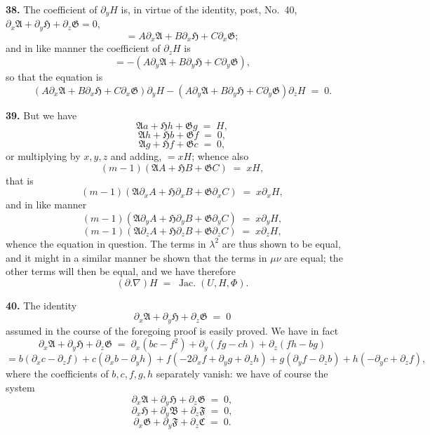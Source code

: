 \documentclass[11pt,a4paper]{article}
\providecommand{\Jac}{\operatorname{Jac.}}
\begin{document}
\medskip

\textbf{38.} The coefficient of $\partial_y H$ is, in virtue of the identity, post, No.~40, $\partial_x\mathfrak{A} + \partial_y\mathfrak{H} + \partial_z\mathfrak{G} = 0$,
\[
= A\partial_x\mathfrak{A} + B\partial_x\mathfrak{H} + C\partial_x\mathfrak{G};
\]
and in like manner the coefficient of $\partial_z H$ is
\[
= -(A\partial_y\mathfrak{A} + B\partial_y\mathfrak{H} + C\partial_y\mathfrak{G}),
\]
so that the equation is
\[
(A\partial_x\mathfrak{A} + B\partial_x\mathfrak{H} + C\partial_x\mathfrak{G})\partial_y H - (A\partial_y\mathfrak{A} + B\partial_y\mathfrak{H} + C\partial_y\mathfrak{G})\partial_z H \;=\; 0.
\]

\medskip

\textbf{39.} But we have
\[
\mathfrak{A}a + \mathfrak{H}h + \mathfrak{G}g \;=\; H,
\]
\[
\mathfrak{A}h + \mathfrak{H}b + \mathfrak{G}f \;=\; 0,
\]
\[
\mathfrak{A}g + \mathfrak{H}f + \mathfrak{G}c \;=\; 0,
\]
or multiplying by $x,y,z$ and adding, $= xH$;
whence also
\[
(m-1)(\mathfrak{A}A + \mathfrak{H}B + \mathfrak{G}C) \;=\; xH,
\]
that is
\[
(m-1)(\mathfrak{A}\partial_x A + \mathfrak{H}\partial_x B + \mathfrak{G}\partial_x C) \;=\; x\partial_x H,
\]
and in like manner
\[
(m-1)(\mathfrak{A}\partial_y A + \mathfrak{H}\partial_y B + \mathfrak{G}\partial_y C) \;=\; x\partial_y H,
\]
\[
(m-1)(\mathfrak{A}\partial_z A + \mathfrak{H}\partial_z B + \mathfrak{G}\partial_z C) \;=\; x\partial_z H,
\]
whence the equation in question. The terms in $\lambda^2$ are thus shown to be equal, and it might in a similar manner be shown that the terms in $\mu\nu$ are equal; the other terms will then be equal, and we have therefore
\[
(\partial.\nabla)H \;=\; \Jac(U,H,\Phi).
\]

\medskip

\textbf{40.} The identity
\[
\partial_x\mathfrak{A} + \partial_y\mathfrak{H} + \partial_z\mathfrak{G} \;=\; 0
\]
assumed in the course of the foregoing proof is easily proved. We have in fact
\[
\partial_x\mathfrak{A} + \partial_y\mathfrak{H} + \partial_z\mathfrak{G} \;=\; \partial_x(bc - f^2) + \partial_y(fg - ch) + \partial_z(fh - bg)
\]
\[
= b(\partial_x c - \partial_z f) + c(\partial_x b - \partial_y h) + f(-2\partial_x f + \partial_y g + \partial_z h) + g(\partial_y f - \partial_z b) + h(-\partial_y c + \partial_z f),
\]
where the coefficients of $b, c, f, g, h$ separately vanish: we have of course the system
\[
\partial_x\mathfrak{A} + \partial_y\mathfrak{H} + \partial_z\mathfrak{G} \;=\; 0,
\]
\[
\partial_x\mathfrak{H} + \partial_y\mathfrak{B} + \partial_z\mathfrak{F} \;=\; 0,
\]
\[
\partial_x\mathfrak{G} + \partial_y\mathfrak{F} + \partial_z\mathfrak{C} \;=\; 0.
\]
\end{document}
